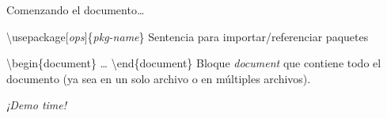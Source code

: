 \begin{frame}{Comenzando el documento\ldots}

    \begin{block}{\textbackslash usepackage[\textit{ops}]\{\textit{pkg-name}\}}
        Sentencia para importar/referenciar paquetes
    \end{block}

    \pause
    \vspace{0.75cm}

    \begin{block}{\textbackslash begin\{document\} \ldots{} \textbackslash end\{document\}}
        Bloque \textit{document} que contiene todo el documento (ya sea en un solo archivo o en múltiples archivos).
    \end{block}

    \pause
    \vspace{0.5cm}

    \begin{center}
        \textit{¡Demo time!}
    \end{center}
\end{frame}